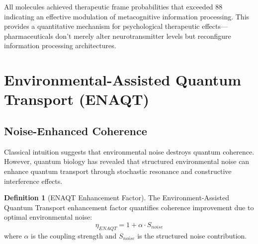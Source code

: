 \documentclass{article}
\theoremstyle{definition}
\newtheorem{definition}[theorem]{Definition}
\theoremstyle{remark}
\begin{document}
All molecules achieved therapeutic frame probabilities that exceeded 88 \, indicating an effective modulation of metacognitive information processing. This provides a quantitative mechanism for psychological therapeutic effects—pharmaceuticals don't merely alter neurotransmitter levels but reconfigure information processing architectures.

\section{Environmental-Assisted Quantum Transport (ENAQT)}

\subsection{Noise-Enhanced Coherence}

Classical intuition suggests that environmental noise destroys quantum coherence. However, quantum biology has revealed that structured environmental noise can enhance quantum transport through stochastic resonance and constructive interference effects\cite{Plenio2008,Mohseni2014}.

\begin{definition}[ENAQT Enhancement Factor]
The Environment-Assisted Quantum Transport enhancement factor quantifies coherence improvement due to optimal environmental noise:
\begin{equation}
\eta_{ENAQT} = 1 + \alpha \cdot S_{noise}
\label{eq:enaqt_factor}
\end{equation}
where $\alpha$ is the coupling strength and $S_{noise}$ is the structured noise contribution.
\end{definition}
\end{document}
